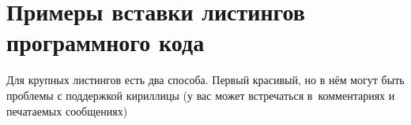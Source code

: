 \chapter{Примеры вставки листингов программного кода}\label{app:A}

Для крупных листингов есть два способа. Первый красивый, но в нём могут быть
проблемы с поддержкой кириллицы (у вас может встречаться в~комментариях
и печатаемых сообщениях)